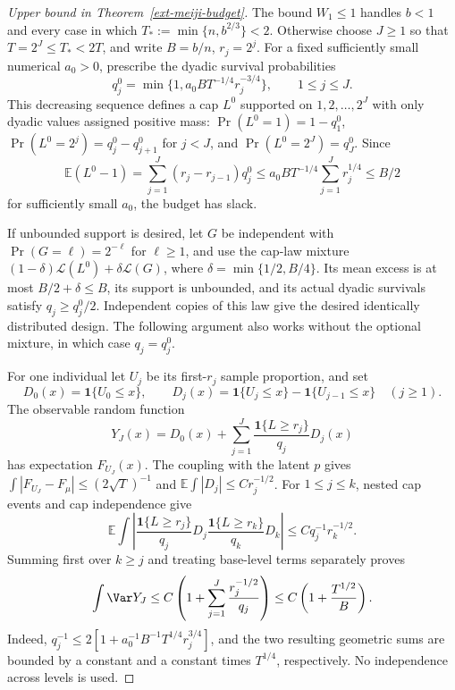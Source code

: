 \documentclass[11pt,a4paper]{article}
\theoremstyle{definition}\newtheorem{definition}[theorem]{Definition}
\theoremstyle{remark}\newtheorem{remark}[theorem]{Remark}
\newcommand{\E}{\mathbb E}\newcommand{\one}{\mathbf 1}\newcommand{\1}{\mathbf 1}
\numberwithin{equation}{section}
\begin{document}
\begin{proof}[Upper bound in Theorem~\ref{ext-meiji-budget}]
The bound $W_1\le1$ handles $b<1$ and every case in which
$T_*:=\min\{n,b^{2/3}\}<2$. Otherwise choose $J\ge1$ so that
$T=2^J\le T_*<2T$, and write $B=b/n$, $r_j=2^j$. For a fixed sufficiently
small numerical $a_0>0$, prescribe the dyadic survival probabilities
\[
 q_j^0=\min\{1,a_0B T^{-1/4}r_j^{-3/4}\},\qquad 1\le j\le J.
\]
This decreasing sequence defines a cap $L^0$ supported on
$1,2,\ldots,2^J$ with only dyadic values assigned positive mass:
$\Pr(L^0=1)=1-q_1^0$, $\Pr(L^0=2^j)=q_j^0-q_{j+1}^0$ for $j<J$, and
$\Pr(L^0=2^J)=q_J^0$. Since
\[
 \E(L^0-1)
 =\sum_{j=1}^J(r_j-r_{j-1})q_j^0
 \le a_0B T^{-1/4}\sum_{j=1}^Jr_j^{1/4}\le B/2
\]
for sufficiently small $a_0$, the budget has slack.

If unbounded support is desired, let $G$ be independent with
$\Pr(G=\ell)=2^{-\ell}$ for $\ell\ge1$, and use the cap-law mixture
$(1-\delta)\mathcal L(L^0)+\delta\mathcal L(G)$, where
$\delta=\min\{1/2,B/4\}$. Its mean excess is at most $B/2+\delta\le B$,
its support is unbounded, and its actual dyadic survivals satisfy
$q_j\ge q_j^0/2$. Independent copies of this law give the desired
identically distributed design. The following argument also works
without the optional mixture, in which case $q_j=q_j^0$.

For one individual let $U_j$ be its first-$r_j$ sample proportion, and set
\[
 D_0(x)=\mathbf1\{U_0\le x\},\qquad
 D_j(x)=\mathbf1\{U_j\le x\}-\mathbf1\{U_{j-1}\le x\}\quad(j\ge1).
\]
The observable random function
\[
 Y_J(x)=D_0(x)+\sum_{j=1}^J
           \frac{\mathbf1\{L\ge r_j\}}{q_j}D_j(x)
\]
has expectation $F_{U_J}(x)$. The coupling with the latent $p$ gives
$\int|F_{U_J}-F_\mu|\le(2\sqrt T)^{-1}$ and
$\E\int|D_j|\le C r_j^{-1/2}$. For $1\le j\le k$, nested cap events
and cap independence give
\[
 \E\int\left|
 \frac{\mathbf1\{L\ge r_j\}}{q_j}D_j
 \frac{\mathbf1\{L\ge r_k\}}{q_k}D_k\right|
 \le Cq_j^{-1}r_k^{-1/2}.
\]
Summing first over $k\ge j$ and treating base-level terms separately
proves
\[
 \int\Var Y_J\le C\left(1+\sum_{j=1}^J\frac{r_j^{-1/2}}{q_j}\right)
 \le C\left(1+\frac{T^{1/2}}{B}\right).
\]
Indeed, $q_j^{-1}\le2[1+a_0^{-1}B^{-1}T^{1/4}r_j^{3/4}]$, and the
two resulting geometric sums are bounded by a constant and a constant
times $T^{1/4}$, respectively. No independence across levels is used.


\end{proof}
\end{document}
